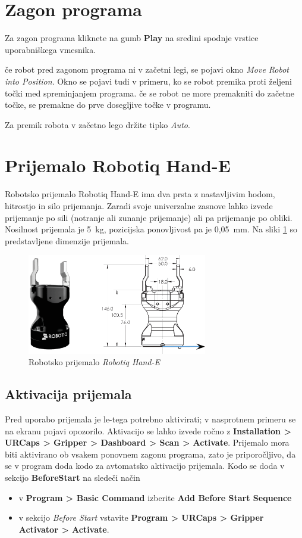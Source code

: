 \section{Zagon programa}

Za zagon programa kliknete na gumb  \textbf{Play} na sredini spodnje vrstice uporabniškega vmesnika.

če robot pred zagonom programa ni v začetni legi, se pojavi okno \emph{Move Robot into Position}. Okno se pojavi tudi v primeru, ko se robot premika proti željeni točki med spreminjanjem programa. če se robot ne more premakniti do začetne točke, se premakne do prve dosegljive točke v programu.

Za premik robota v začetno lego držite tipko \emph{Auto}.


\section{Prijemalo Robotiq Hand-E}

Robotsko prijemalo Robotiq Hand-E ima dva prsta z nastavljivim hodom, hitrostjo in silo prijemanja. Zaradi svoje univerzalne zasnove lahko izvede prijemanje po sili  (notranje ali zunanje prijemanje) ali pa prijemanje po obliki. Nosilnost prijemala je 5~kg, pozicijska ponovljivost pa je 0,05~mm. Na sliki \ref{fig:ur_gripper} so predstavljene dimenzije prijemala.

\begin{figure}[!hbt]
\centering
\includegraphics[width=0.7\textwidth]{ur5e_gripper.eps}
\caption{Robotsko prijemalo \emph{Robotiq Hand-E}}
\label{fig:ur_gripper}
\end{figure}

\subsection{Aktivacija prijemala}

Pred uporabo prijemala je le-tega potrebno  aktivirati; v nasprotnem primeru se na ekranu pojavi opozorilo. Aktivacijo se lahko izvede ročno z \textbf{Installation > URCaps > Gripper > Dashboard > Scan > Activate}.  Prijemalo mora biti aktivirano ob vsakem ponovnem zagonu programa, zato je priporočljivo, da se v program doda kodo za avtomatsko aktivacijo prijemala. Kodo se doda v sekcijo \textbf{BeforeStart} na sledeči način
\begin{itemize}
    \item v \textbf{Program > Basic Command} izberite \textbf{Add Before Start Sequence}
    \item v sekcijo \emph{Before Start} vstavite \textbf{Program > URCaps > Gripper Activator > Activate}.
\end{itemize}

